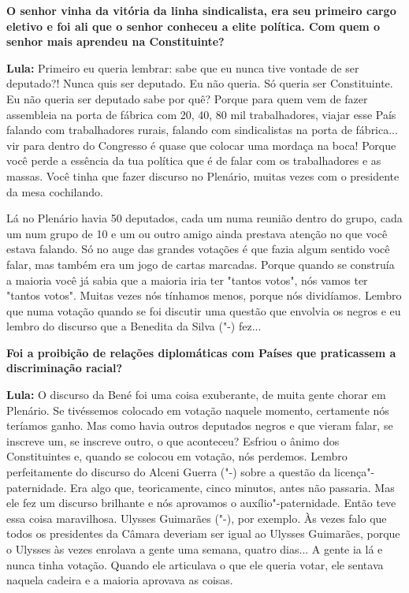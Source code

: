 \textbf{O senhor vinha da vitória da linha sindicalista, era seu
primeiro cargo eletivo e foi ali que o senhor conheceu a elite política.
Com quem o senhor mais aprendeu na Constituinte?}

\textbf{Lula:} Primeiro eu queria lembrar: sabe que eu nunca tive
vontade de ser deputado?! Nunca quis ser deputado. Eu não queria. Só
queria ser Constituinte. Eu não queria ser deputado sabe por quê? Porque
para quem vem de fazer assembleia na porta de fábrica com 20, 40, 80 mil
trabalhadores, viajar esse País falando com trabalhadores rurais,
falando com sindicalistas na porta de fábrica... vir para dentro do
Congresso é quase que colocar uma mordaça na boca! Porque você perde a
essência da tua política que é de falar com os trabalhadores e as
massas. Você tinha que fazer discurso no Plenário, muitas vezes com o
presidente da mesa cochilando.

Lá no Plenário havia 50 deputados, cada um numa reunião dentro do grupo,
cada um num grupo de 10 e um ou outro amigo ainda prestava atenção no
que você estava falando. Só no auge das grandes votações é que fazia
algum sentido você falar, mas também era um jogo de cartas marcadas.
Porque quando se construía a maioria você já sabia que a maioria iria
ter "tantos votos", nós vamos ter "tantos votos". Muitas vezes nós
tínhamos menos, porque nós dividíamos. Lembro que numa votação quando se
foi discutir uma questão que envolvia os negros e eu lembro do discurso
que a Benedita da Silva ("-) fez...

\textbf{Foi a proibição de relações diplomáticas com Países que
praticassem a discriminação racial?}

\textbf{Lula:} O discurso da Bené foi uma coisa exuberante, de muita
gente chorar em Plenário. Se tivéssemos colocado em votação naquele
momento, certamente nós teríamos ganho. Mas como havia outros deputados
negros e que vieram falar, se inscreve um, se inscreve outro, o que
aconteceu? Esfriou o ânimo dos Constituintes e, quando se colocou em
votação, nós perdemos. Lembro perfeitamente do discurso do Alceni Guerra
("-) sobre a questão da licença"-paternidade. Era algo que,
teoricamente, cinco minutos, antes não passaria. Mas ele fez um discurso
brilhante e nós aprovamos o auxílio"-paternidade. Então teve essa coisa
maravilhosa. Ulysses Guimarães ("-), por exemplo. Às vezes falo que
todos os presidentes da Câmara deveriam ser igual ao Ulysses Guimarães,
porque o Ulysses às vezes enrolava a gente uma semana, quatro dias... A
gente ia lá e nunca tinha votação. Quando ele articulava o que ele
queria votar, ele sentava naquela cadeira e a maioria aprovava as
coisas.


